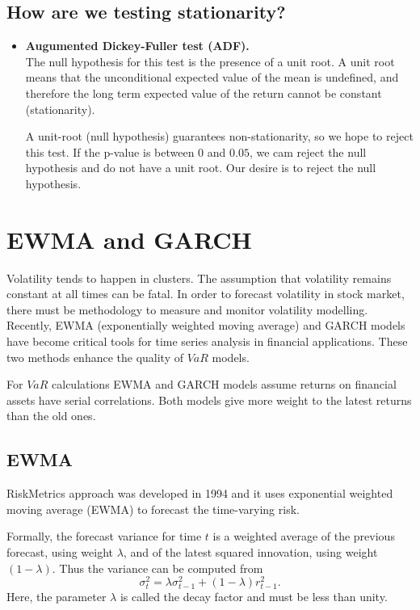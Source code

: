 \documentclass{book}
\begin{document}
\subsection{How are we testing stationarity?}
\begin{itemize}
\item \textbf{Augumented Dickey-Fuller test (ADF).}\\
The null hypothesis for this test is the presence of a unit root. A unit root means that the unconditional expected value of the mean is undefined, and therefore the long term expected value of the return cannot be constant (stationarity). 

A unit-root (null hypothesis) guarantees non-stationarity, so we hope to reject this test. If the p-value is between $0$ and $0.05$, we cam reject the null hypothesis and do not have a unit root. Our desire is to reject the null hypothesis.

 
\end{itemize}
\section{EWMA and GARCH}
Volatility tends to happen in clusters. The assumption that volatility remains constant at all times can be fatal. In order to forecast volatility in stock market, there must be methodology to measure and monitor volatility modelling. Recently, EWMA (exponentially weighted moving average) and GARCH models have become critical tools for time series analysis in financial applications. These two methods enhance the quality of $VaR$ models.

For $VaR$ calculations EWMA and GARCH models assume returns on financial assets have serial correlations. Both models give more weight to the latest  returns than the old ones.
\subsection{EWMA}
RiskMetrics approach was developed in 1994 and it uses exponential weighted moving average (EWMA) to forecast the time-varying risk.

Formally, the forecast variance for time $t$ is a weighted average of the previous forecast, using weight $\lambda$, and of the latest squared innovation, using weight $(1-\lambda)$. Thus the variance can be computed from
$$
\sigma_{t}^{2}=\lambda\sigma_{t-1}^{2}+(1-\lambda)r_{t-1}^{2}.
$$
Here, the parameter $\lambda$ is called the decay factor and must be less than unity.
\end{document}
